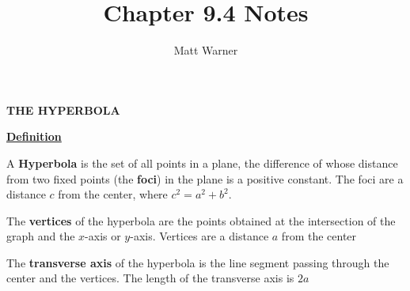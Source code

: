 \documentclass{report}
\title{\Huge{Chapter 9.4 Notes}}
\author{\huge{Matt Warner}}
\date{\huge{}}
\begin{document}
	\maketitle
	\begin{LARGE}
		\begin{center}
		\noindent \textbf{THE HYPERBOLA}
		\end{center}
	\end{LARGE}
\bigbreak \noindent \bigbreak \noindent \bigbreak \noindent

\begin{LARGE}
	\noindent \textbf{\underline{Definition}}
\end{LARGE}
\vspace{3mm}

\noindent A \textbf{Hyperbola} is the set of all points in a plane, the difference of whose distance from two fixed points (the \textbf{foci}) in the plane is a positive constant. The foci are a distance $c$ from the center, where $ c^{2} = a^{2} + b^{2}.$
\vspace{5mm}

\noindent The \textbf{vertices} of the hyperbola are the points obtained at the intersection of the graph and the $x$-axis or $y$-axis. Vertices are a distance $a$ from the center
\vspace{5mm}

\noindent The \textbf{transverse axis} of the hyperbola is the line segment passing through the center and the vertices. The length of the transverse axis is $2a$
\vspace{5mm}
\end{document}

